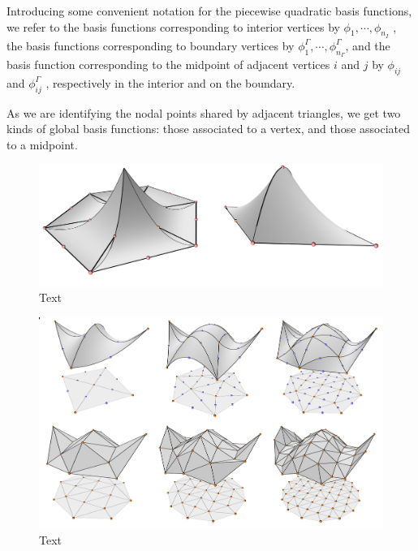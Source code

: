 Introducing some convenient notation for the piecewise quadratic basis functions,
we refer to the basis functions corresponding to interior vertices by $\phi_1,\cdots,\phi_{n_I}$ ,
the basis functions corresponding to boundary vertices by $\phi_1^\Gamma,\cdots,\phi_{n_\Gamma}^\Gamma$,
and the basis function corresponding to the midpoint of adjacent vertices $i$ and $j$ by $\phi_{ij}$ and $\phi^\Gamma_{ij}$
, respectively in the interior and on the boundary.

As we are identifying the nodal points shared by adjacent triangles, we get two kinds of global basis functions:
those associated to a vertex, and those associated to a midpoint.
\begin{figure}[H]
    \begin{center}
        \includegraphics[width=0.8\linewidth]{figures/basis_functions/quadratic_basis_global.png}
    \end{center}
    \caption{\scriptsize
        Text
    }
    \label{quadratic_basis_global}
\end{figure}


\begin{figure}[H]
    \begin{center}
        \includegraphics[width=1\linewidth]{figures/quadratic_approx/collage_1.png}
    \end{center}
    \caption{\scriptsize
        Text
    }
    \label{quadratic_approx}
\end{figure}

